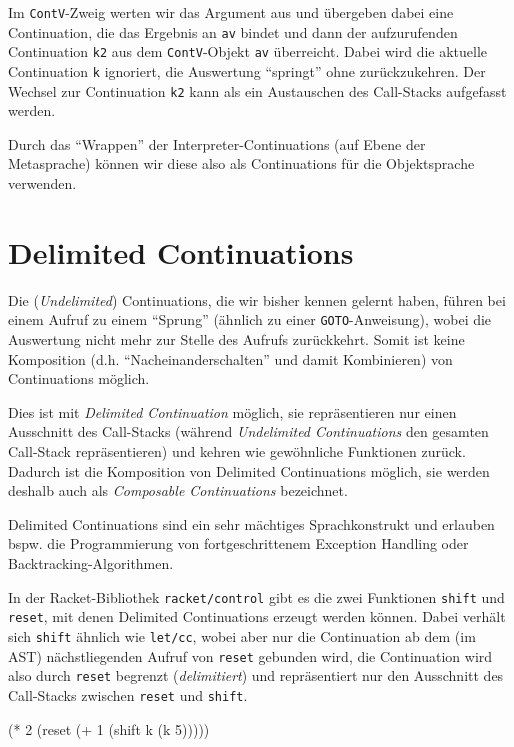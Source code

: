 \documentclass[]{article}
\newenvironment{Shaded}{}{}
\newcommand{\DecValTok}[1]{\textcolor[rgb]{0.25,0.63,0.44}{#1}}
\newcommand{\NormalTok}[1]{#1}
\newcommand{\OperatorTok}[1]{\textcolor[rgb]{0.40,0.40,0.40}{#1}}
\begin{document}
Im \texttt{ContV}-Zweig werten wir das Argument aus und übergeben dabei
eine Continuation, die das Ergebnis an \texttt{av} bindet und dann der
aufzurufenden Continuation \texttt{k2} aus dem \texttt{ContV}-Objekt
\texttt{av} überreicht. Dabei wird die aktuelle Continuation \texttt{k}
ignoriert, die Auswertung ``springt'' ohne zurückzukehren. Der Wechsel
zur Continuation \texttt{k2} kann als ein Austauschen des Call-Stacks
aufgefasst werden.

Durch das ``Wrappen'' der Interpreter-Continuations (auf Ebene der
Metasprache) können wir diese also als Continuations für die
Objektsprache verwenden.

\hypertarget{delimited-continuations}{%
\section{Delimited Continuations}\label{delimited-continuations}}

Die (\emph{Undelimited}) Continuations, die wir bisher kennen gelernt
haben, führen bei einem Aufruf zu einem ``Sprung'' (ähnlich zu einer
\texttt{GOTO}-Anweisung), wobei die Auswertung nicht mehr zur Stelle des
Aufrufs zurückkehrt. Somit ist keine Komposition (d.h.
``Nacheinanderschalten'' und damit Kombinieren) von Continuations
möglich.

Dies ist mit \emph{Delimited Continuation} möglich, sie repräsentieren
nur einen Ausschnitt des Call-Stacks (während \emph{Undelimited
Continuations} den gesamten Call-Stack repräsentieren) und kehren wie
gewöhnliche Funktionen zurück. Dadurch ist die Komposition von Delimited
Continuations möglich, sie werden deshalb auch als \emph{Composable
Continuations} bezeichnet.

Delimited Continuations sind ein sehr mächtiges Sprachkonstrukt und
erlauben bspw. die Programmierung von fortgeschrittenem Exception
Handling oder Backtracking-Algorithmen.

In der Racket-Bibliothek \texttt{racket/control} gibt es die zwei
Funktionen \texttt{shift} und \texttt{reset}, mit denen Delimited
Continuations erzeugt werden können. Dabei verhält sich \texttt{shift}
ähnlich wie \texttt{let/cc}, wobei aber nur die Continuation ab dem (im
AST) nächstliegenden Aufruf von \texttt{reset} gebunden wird, die
Continuation wird also durch \texttt{reset} begrenzt
(\emph{delimitiert}) und repräsentiert nur den Ausschnitt des
Call-Stacks zwischen \texttt{reset} und \texttt{shift}.

\begin{Shaded}
\begin{Highlighting}[]
\NormalTok{(}\OperatorTok{*} \DecValTok{2}\NormalTok{ (reset (}\OperatorTok{+} \DecValTok{1}\NormalTok{ (shift k (k }\DecValTok{5}\NormalTok{)))))}
\end{Highlighting}
\end{Shaded}
\end{document}
